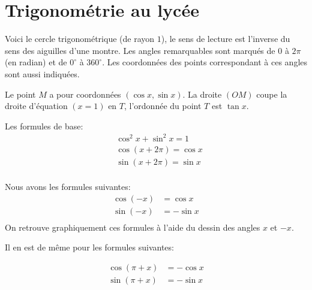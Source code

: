 \documentclass[10pt,class=article,crop=false]{standalone}
\begin{document}
\section{Trigonométrie au lycée}

\begin{multicols}{2}



Voici le cercle trigonométrique (de rayon $1$),
le sens de lecture est l'inverse du sens des aiguilles d'une montre.
Les angles remarquables sont marqués de $0$ à $2 \pi$ (en radian) et de $0^\circ$ à $360^\circ$.
Les coordonnées des points correspondant à ces angles sont aussi indiquées.



Le point $M$ a pour coordonnées $(\cos x,\sin x)$.
La droite $(OM)$ coupe la droite d'équation $(x=1)$ en $T$,
l'ordonnée du point $T$ est $\tan x$.

Les formules de base:
\begin{align*}
	& \cos^2 x + \sin^2 x = 1 \\
	& \cos(x+2\pi)=\cos x \\
	& \sin(x+2\pi)=\sin x \\
\end{align*}

\begin{minipage}{0.45\textwidth}
\end{minipage}
\begin{minipage}{0.42\textwidth}
	Nous avons les formules suivantes:
	\begin{align*}
		\cos (-x) &= \cos x \\
		\sin (-x) &= -\sin x \\
	\end{align*}
	On retrouve graphiquement ces formules à l'aide du dessin des angles $x$ et $-x$.
\end{minipage}

Il en est de même pour les formules suivantes:

\begin{minipage}{0.25\textwidth}
\end{minipage}	
\begin{minipage}{0.15\textwidth}
	\begin{align*}
		\cos (\pi + x) &= -\cos x \\
		\sin (\pi + x) &= -\sin x \\
	\end{align*}
\end{minipage}


\end{multicols}
\end{document}
